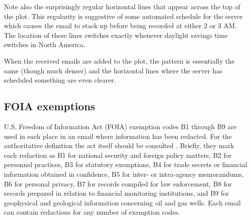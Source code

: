 \documentclass[journal]{vgtc}                %
\begin{document}
Note also the surprisingly regular horizontal lines that appear across the top of the plot.  This regularity is suggestive of some automated schedule for the server which causes the email to stack up before being recorded at either 2 or 3 AM.  The location of these lines switches exactly whenever daylight savings time switches in North America.  

When the received emails are added to the plot, the pattern is essentially the same (though much denser) and the horizontal lines where the server has scheduled something are even clearer.

\subsection{FOIA exemptions}
\label{sect:Displays:FOIA}
U.S. Freedom of Information Act (FOIA) exemption codes B1 through B9 are used in each place in an email where information has been redacted.  For the authoritative definition the act itself should be consulted \cite{FOIA}.  Briefly, they mark each redaction as B1 for national security and foreign policy matters,  B2 for personnel practices, B3 for statutory exemptions,  B4 for trade secrets or financial information obtained in confidence,  B5 for inter- or intra-agency memorandums,  B6 for personal privacy,  B7 for records compiled for law enforcement,  B8 for records prepared in relation to financial monitoring institutions, and B9 for geophysical and geological information concerning oil and gas wells.   Each email can contain redactions for any number of exemption codes.
\end{document}

